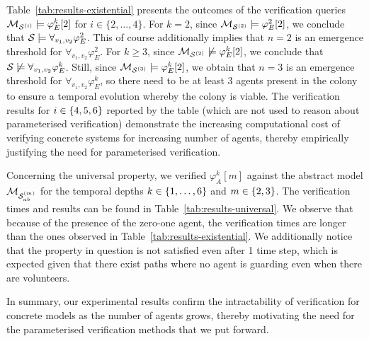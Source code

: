 Table~\ref{tab:results-existential} presents the outcomes of
the verification queries
$\mathcal{M}_{\mathcal{S}^{(i)}}\models\varphi^k_E[2]$ for $i \in
\{2, \ldots, 4\}$.
%
For $k=2$, since  $\mathcal{M}_{\mathcal{S}^{(2)}}
\models\varphi^2_E[2]$, we conclude that
$\mathcal S\models\forall_{v_1,v_2}\varphi^2_E$. This of course
additionally implies that $n=2$ is an emergence threshold
for $\forall_{v_1,v_2}\varphi^2_E$. For $k \geq 3$, since
$\mathcal{M}_{\mathcal{S}^{(2)}}\not\models\varphi^k_E[2]$, we
conclude that
$\mathcal S\not\models\forall_{v_1,v_2}\varphi^k_E$. Still, since
$\mathcal{M}_{\mathcal{S}^{(3)}}\models\varphi^k_E[2]$, we obtain
that $n=3$ is an emergence threshold for
$\forall_{v_1,v_2}\varphi^k_E$, so there need to be at least
3 agents present in the colony to ensure a temporal
evolution whereby the colony is viable.
The verification results for $i \in \left \{ 4,5,6 \right \}$ reported
by the table (which are not used
to reason about parameterised verification) demonstrate the
increasing computational cost of verifying concrete systems
for increasing number of agents, thereby empirically
justifying the need for parameterised verification.



%

Concerning the universal property, we verified
$\varphi^k_A[m]$ against the abstract model $\mathcal{M}_{\mathcal{S}_{ab}^{(m)}}$ for
the temporal depths $k \in \left \{ 1,\dots,6 \right \}$ and  $m \in
\left \{ 2,3 \right \}$. The verification times and results can be found
in Table~\ref{tab:results-universal}. We observe that
because of 
the presence of the zero-one agent, the verification times
are longer than the ones observed in
Table~\ref{tab:results-existential}. We additionally notice
that the property in question is not satisfied even after 1 time step,
which is expected given that there exist paths where no agent is
guarding even when there are volunteers.

In summary, our experimental results confirm the
intractability of verification for concrete models as the
number of agents grows, thereby motivating the need for the
parameterised verification methods that we put forward.



